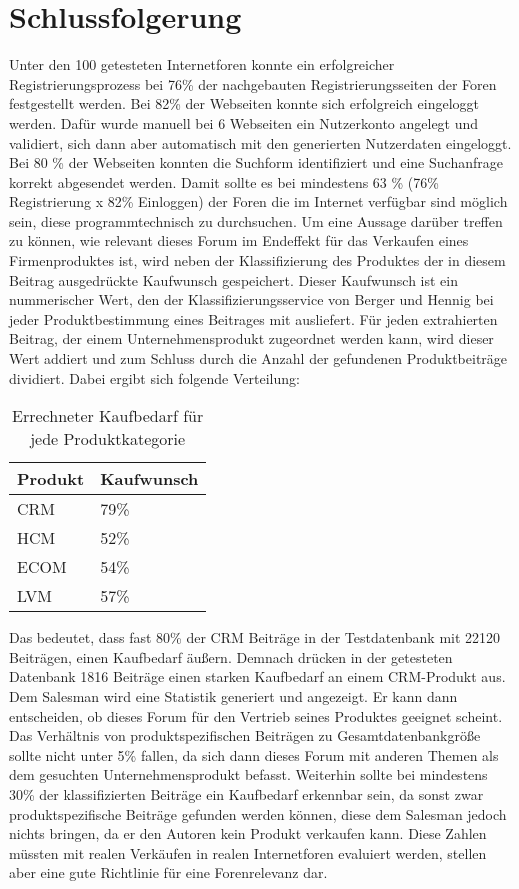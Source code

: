 \section{Schlussfolgerung}
Unter den 100 getesteten Internetforen konnte ein erfolgreicher Registrierungsprozess bei 76\% der nachgebauten Registrierungsseiten der Foren festgestellt werden. Bei 82\% der Webseiten konnte sich erfolgreich eingeloggt werden. Dafür wurde manuell bei 6 Webseiten ein Nutzerkonto angelegt und validiert, sich dann aber automatisch mit den generierten Nutzerdaten eingeloggt. Bei 80 \% der Webseiten konnten die Suchform identifiziert und eine Suchanfrage korrekt abgesendet werden. Damit sollte es bei mindestens 63 \% (76\% Registrierung x 82\% Einloggen) der Foren die im Internet verfügbar sind möglich sein, diese programmtechnisch zu durchsuchen.
Um eine Aussage darüber treffen zu können, wie relevant dieses Forum im Endeffekt für das Verkaufen eines Firmenproduktes ist, wird neben der Klassifizierung des Produktes der in diesem Beitrag ausgedrückte Kaufwunsch gespeichert. Dieser Kaufwunsch ist ein nummerischer Wert, den der Klassifizierungsservice von Berger und Hennig\cite{n2o} bei jeder Produktbestimmung eines Beitrages mit ausliefert. Für jeden extrahierten Beitrag, der einem Unternehmensprodukt zugeordnet werden kann, wird dieser Wert addiert und zum Schluss durch die Anzahl der gefundenen Produktbeiträge dividiert. Dabei ergibt sich folgende Verteilung: 

\begin{table}[h!]
\centering
\begin{tabular}{ | p{3cm} | l |}
\hline
\textbf{Produkt} & \textbf{Kaufwunsch}\\ \hline
CRM & 79\% \\ \hline
HCM & 52\% \\ \hline
ECOM & 54\% \\ \hline
LVM & 57\% \\ \hline
\end{tabular}
\caption{Errechneter Kaufbedarf für jede Produktkategorie}
\end{table}

Das bedeutet, dass fast 80\% der CRM Beiträge in der Testdatenbank mit 22120 Beiträgen, einen Kaufbedarf äußern. Demnach drücken in der getesteten Datenbank 1816 Beiträge einen starken Kaufbedarf an einem CRM-Produkt aus. Dem Salesman wird eine Statistik generiert und angezeigt. Er kann dann entscheiden, ob dieses Forum für den Vertrieb seines Produktes geeignet scheint. Das Verhältnis von produktspezifischen Beiträgen zu Gesamtdatenbankgröße sollte nicht unter 5\% fallen, da sich dann dieses Forum mit anderen Themen als dem gesuchten Unternehmensprodukt befasst. Weiterhin sollte bei mindestens 30\% der klassifizierten Beiträge ein Kaufbedarf erkennbar sein, da sonst zwar produktspezifische Beiträge gefunden werden können, diese dem Salesman jedoch nichts bringen, da er den Autoren kein Produkt verkaufen kann. Diese Zahlen müssten mit realen Verkäufen in realen Internetforen evaluiert werden, stellen aber eine gute Richtlinie für eine Forenrelevanz dar.


